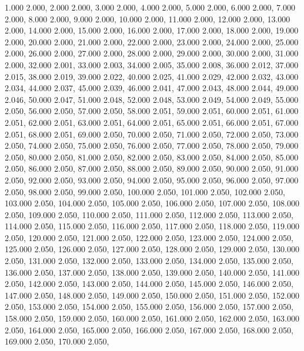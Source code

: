 1.000 2.000, 
2.000 2.000, 
3.000 2.000, 
4.000 2.000, 
5.000 2.000, 
6.000 2.000, 
7.000 2.000, 
8.000 2.000, 
9.000 2.000, 
10.000 2.000, 
11.000 2.000, 
12.000 2.000, 
13.000 2.000, 
14.000 2.000, 
15.000 2.000, 
16.000 2.000, 
17.000 2.000, 
18.000 2.000, 
19.000 2.000, 
20.000 2.000, 
21.000 2.000, 
22.000 2.000, 
23.000 2.000, 
24.000 2.000, 
25.000 2.000, 
26.000 2.000, 
27.000 2.000, 
28.000 2.000, 
29.000 2.000, 
30.000 2.000, 
31.000 2.000, 
32.000 2.001, 
33.000 2.003, 
34.000 2.005, 
35.000 2.008, 
36.000 2.012, 
37.000 2.015, 
38.000 2.019, 
39.000 2.022, 
40.000 2.025, 
41.000 2.029, 
42.000 2.032, 
43.000 2.034, 
44.000 2.037, 
45.000 2.039, 
46.000 2.041, 
47.000 2.043, 
48.000 2.044, 
49.000 2.046, 
50.000 2.047, 
51.000 2.048, 
52.000 2.048, 
53.000 2.049, 
54.000 2.049, 
55.000 2.050, 
56.000 2.050, 
57.000 2.050, 
58.000 2.051, 
59.000 2.051, 
60.000 2.051, 
61.000 2.051, 
62.000 2.051, 
63.000 2.051, 
64.000 2.051, 
65.000 2.051, 
66.000 2.051, 
67.000 2.051, 
68.000 2.051, 
69.000 2.050, 
70.000 2.050, 
71.000 2.050, 
72.000 2.050, 
73.000 2.050, 
74.000 2.050, 
75.000 2.050, 
76.000 2.050, 
77.000 2.050, 
78.000 2.050, 
79.000 2.050, 
80.000 2.050, 
81.000 2.050, 
82.000 2.050, 
83.000 2.050, 
84.000 2.050, 
85.000 2.050, 
86.000 2.050, 
87.000 2.050, 
88.000 2.050, 
89.000 2.050, 
90.000 2.050, 
91.000 2.050, 
92.000 2.050, 
93.000 2.050, 
94.000 2.050, 
95.000 2.050, 
96.000 2.050, 
97.000 2.050, 
98.000 2.050, 
99.000 2.050, 
100.000 2.050, 
101.000 2.050, 
102.000 2.050, 
103.000 2.050, 
104.000 2.050, 
105.000 2.050, 
106.000 2.050, 
107.000 2.050, 
108.000 2.050, 
109.000 2.050, 
110.000 2.050, 
111.000 2.050, 
112.000 2.050, 
113.000 2.050, 
114.000 2.050, 
115.000 2.050, 
116.000 2.050, 
117.000 2.050, 
118.000 2.050, 
119.000 2.050, 
120.000 2.050, 
121.000 2.050, 
122.000 2.050, 
123.000 2.050, 
124.000 2.050, 
125.000 2.050, 
126.000 2.050, 
127.000 2.050, 
128.000 2.050, 
129.000 2.050, 
130.000 2.050, 
131.000 2.050, 
132.000 2.050, 
133.000 2.050, 
134.000 2.050, 
135.000 2.050, 
136.000 2.050, 
137.000 2.050, 
138.000 2.050, 
139.000 2.050, 
140.000 2.050, 
141.000 2.050, 
142.000 2.050, 
143.000 2.050, 
144.000 2.050, 
145.000 2.050, 
146.000 2.050, 
147.000 2.050, 
148.000 2.050, 
149.000 2.050, 
150.000 2.050, 
151.000 2.050, 
152.000 2.050, 
153.000 2.050, 
154.000 2.050, 
155.000 2.050, 
156.000 2.050, 
157.000 2.050, 
158.000 2.050, 
159.000 2.050, 
160.000 2.050, 
161.000 2.050, 
162.000 2.050, 
163.000 2.050, 
164.000 2.050, 
165.000 2.050, 
166.000 2.050, 
167.000 2.050, 
168.000 2.050, 
169.000 2.050, 
170.000 2.050, 
